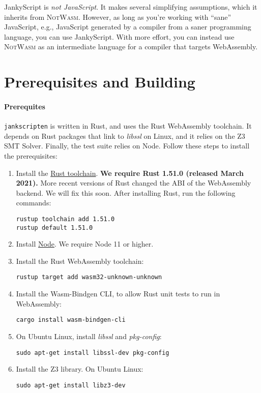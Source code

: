 \documentclass{book}
\newcommand{\system}{\texttt{jankscripten}\xspace}
\newcommand{\notwasm}{\textsc{NotWasm}\xspace}
\newcommand{\jankyscript}{JankyScript\xspace}
\begin{document}
\jankyscript is \emph{not JavaScript}. It makes several simplifying
assumptions, which it inherits from \notwasm. However, as long as you're
working with ``sane'' JavaScript, e.g., JavaScript generated by a compiler from
a saner programming language, you can use JankyScript. With more effort, you
can instead use \notwasm as an intermediate language for a compiler that
targets WebAssembly.

\section{Prerequisites and Building}

\paragraph{Prerequites}
\system is written in Rust, and uses the Rust WebAssembly toolchain. It depends
on Rust packages that link to \emph{libssl} on Linux, and it relies on the Z3
SMT Solver. Finally, the test suite relies on Node. Follow these steps to
install the prerequisites:

\begin{enumerate}

\item Install the \href{https://rustup.rs/}{Rust toolchain}.
\textbf{We require Rust 1.51.0 (released March 2021).} More recent versions of
Rust changed the ABI of the WebAssembly backend. We will fix this soon.
After installing Rust, run the following commands:

\begin{verbatim}
rustup toolchain add 1.51.0
rustup default 1.51.0
\end{verbatim}

\item Install \href{https://nodejs.org/en/}{Node}. We require Node 11 or higher.

\item Install the Rust WebAssembly toolchain:

\begin{verbatim}
rustup target add wasm32-unknown-unknown
\end{verbatim}

\item Install the Wasm-Bindgen CLI, to allow Rust unit tests to run in WebAssembly:

\begin{verbatim}
cargo install wasm-bindgen-cli
\end{verbatim}

\item On Ubuntu Linux, install \emph{libssl} and \emph{pkg-config}:

\begin{verbatim}
sudo apt-get install libssl-dev pkg-config
\end{verbatim}

\item Install the Z3 library. On Ubuntu Linux:

\begin{verbatim}
sudo apt-get install libz3-dev
\end{verbatim}

\end{enumerate}
\end{document}

